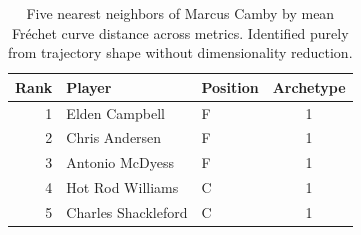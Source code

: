 \begin{table}[htbp]
  \centering\small
  \begin{tabular}{rllc}
    \toprule
    Rank & Player & Position & Archetype \\
    \midrule
    1 & Elden Campbell & F & 1 \\
    2 & Chris Andersen & F & 1 \\
    3 & Antonio McDyess & F & 1 \\
    4 & Hot Rod Williams & C & 1 \\
    5 & Charles Shackleford & C & 1 \\
    \bottomrule
  \end{tabular}
  \caption{Five nearest neighbors of Marcus Camby by mean Fr\'{e}chet curve distance across metrics. Identified purely from trajectory shape without dimensionality reduction.}
  \label{tab:Marcus_Camby_frechet_curve_neighbors}
\end{table}

